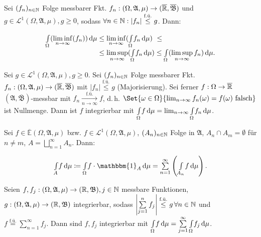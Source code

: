 \documentclass{cheat-sheet}
\newcommand{\ER}{\overline\R} %
\newcommand{\Alg}{\mathfrak{A}} %
\newcommand{\Bor}{\mathfrak{B}} %
\newcommand{\E}{\mathbb{E}} %
\newcommand{\Leb}{\mathcal{L}} %
\newcommand{\ind}{\mathbbm{1}} %
\newcommand{\fue}{\overset{\text{f.ü.}}} %
\newcommand{\IntOmu}[1]{\Int{\Omega}{}{#1}{\mu}} %
\begin{document}
\vspace{-20pt}

\begin{satz}
  \begin{doublespace}
    Sei $(f_n)_{n \in \mathbb{N}}$ Folge messbarer Fkt. $f_n : (\Omega, \Alg, \mu) \to (\ER, \overline{\Bor})$ und $g \in \Leb^1(\Omega, \Alg, \mu), g \geq 0$, sodass $\forall n \in \mathbb{N} : \left|f_n\right| \overset{\text{f.ü.}}\leq g$. Dann:\\[-16pt]
  \end{doublespace}
  \begin{align*}
    \IntOmu{(\liminf_{n \to \infty} (f_n))}
    &\leq \liminf_{n \to \infty} (\IntOmu{f_n}) \,\,\leq\\[-5pt]
    &\leq \limsup_{n \to \infty} (\IntOmu{f_n})
    \leq \IntOmu{(\limsup_{n \to \infty} f_n)}.
  \end{align*}
\end{satz}

\begin{satz}\begin{doublespace}
  Sei $g \in \Leb^1(\Omega, \Alg, \mu), g \geq 0$. Sei $(f_n)_{n \in \mathbb{N}}$ Folge messbarer Fkt. $f_n : (\Omega, \Alg, \mu) \to (\ER, \overline{\Bor})$ mit $\left|f_n\right| \overset{\text{f.ü.}}\leq g$ (Majorisierung).
  Sei ferner $f : \Omega \to \ER$ $(\Alg, \overline{\Bor})$-messbar mit $f_n \xrightarrow[n \to \infty]{\text{f.ü.}} f$, d.\,h. $\Set{ \omega \in \Omega }{ \lim_{n \to \infty} f_n(\omega) = f(\omega) \text{ falsch} }$ ist Nullmenge. Dann ist $f$ integrierbar mit $\IntOmu{f} = \lim_{n \to \infty} \IntOmu{f_n}$.
\end{doublespace}\end{satz}

\vspace{-20pt}

\begin{satz}
  \begin{doublespace}
    Sei $f \in \overline{\E}(\Omega, \Alg, \mu)$ bzw. $f \in \Leb^1(\Omega, \Alg, \mu)$, $(A_n)_{n \in \mathbb{N}}$ Folge in $\Alg$, $A_n \cap A_m = \emptyset$ für $n \not= m$, $A = \bigsqcup_{n=1}^\infty A_n$. Dann:\\[-10pt]
  \end{doublespace}
  \[ \Int{A}{}{f}{\mu} \coloneqq \IntOmu{f \cdot \ind_A} = \sum_{n=1}^\infty \left( \Int{A_n}{}{f}{\mu} \right). \]
\end{satz}

\begin{satz}\begin{doublespace}
  Seien $f, f_j : (\Omega, \Alg, \mu) \to (\R, \Bor), j \in \N$ messbare Funktionen, $g : (\Omega, \Alg, \mu) \to (\R, \Bor)$ integrierbar, sodass $\left|\sum_{j=1}^n f_j\right| \overset{\text{f.ü.}}\leq g \, \forall n \in \N$ und\\[-5pt]
  $f \fue= \sum_{n=1}^\infty f_j$. Dann sind $f, f_j$ integrierbar mit $\IntOmu{f} = \sum_{j=1}^\infty \IntOmu{f_j}$.
\end{doublespace}\end{satz}
\end{document}
